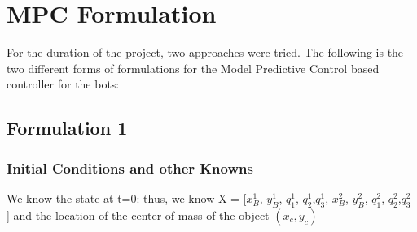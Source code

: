 \documentclass[12pt,english]{report}
\begin{document}
\chapter{MPC Formulation}
For the duration of the project, two approaches were tried. The following is the two different forms of formulations for the Model Predictive Control based controller for the bots:
\section{Formulation 1}
\subsection{Initial Conditions and other Knowns}
We know the state at t=0: thus, we know X = [$x_B^1$, $y_B^1$, $q_1^1$, $q_2^1$,$q_3^1$, $x_B^2$, $y_B^2$, $q_1^2$, $q_2^2$,$q_3^2$ ] and the location of the center of mass of the object $(x_c, y_c)$
\end{document}
